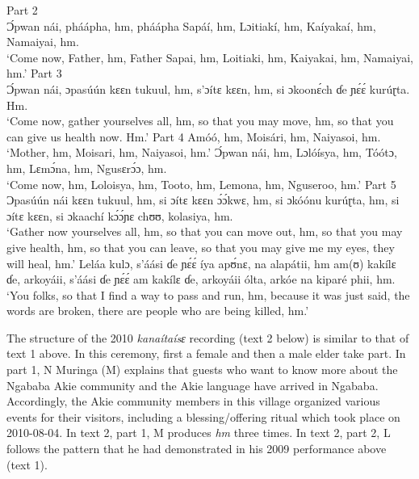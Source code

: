 \documentclass[output=paper,colorlinks,citecolor=brown]{langscibook}
\begin{document}

\ex   Part 2\\\largerpage[1]
      Ɔ́pwan nái, pháápha, hm, pháápha Sapáí, hm, Lɔitiakí, hm, Kaíyakaí, hm, Namaiyai, hm.\\
      `Come now, Father, hm, Father Sapai, hm, Loitiaki, hm, Kaiyakai, hm, Namaiyai, hm.'
\ex   Part 3\\
      Ɔ́pwan nái, ɔpasúún kɛɛn tukuul, hm, s’ɔítɛ kɛɛn, hm, si ɔkoonɛ́ch ɗe ɲɛ́ɛ́ kurúɽta. Hm.\\
      `Come now, gather yourselves all, hm, so that you may move, hm, so that you can  give us health now. Hm.'
\ex   Part 4
      \ea Amóó, hm, Moisári, hm, Naiyasoi, hm.\\
          `Mother, hm, Moisari, hm, Naiyasoi, hm.'
      \ex Ɔ́pwan nái, hm, Lɔlóísya, hm, Tóótɔ, hm, Lɛmɔ́na, hm, Ngusɛrɔ́ɔ, hm.\\
          `Come now, hm, Loloisya, hm, Tooto, hm, Lemona, hm, Nguseroo, hm.'
      \z
\ex   Part 5
    \ea Ɔpasúún nái kɛɛn tukuul, hm, si ɔítɛ kɛɛn ɔ́ɔ́kwɛ, hm, si ɔkóónu kurúɽta, hm, si ɔítɛ kɛɛn, si ɔkaachí kɔ́ɔ́ɲɛ chʊʊ, kolasiya, hm.\\
        `Gather now yourselves all, hm, so that you can move out, hm, so that you may give health, hm, so that you can leave, so that you may give me my eyes, they will heal, hm.'
    \ex Leláa kulɔ, s’áási ɗe ɲɛ́ɛ́ íya apʊ́nɛ, na alapátii, hm am(ʊ) kakílɛ ɗe, arkoyáii, s’áási ɗe ɲɛ́ɛ́ am kakílɛ ɗe, arkoyáii ólta, arkóe na kiparé phii, hm.\\
        `You folks, so that I find a way to pass and run, hm, because it was just said, the words are broken, there are people who are being killed, hm.'
    \z
\z

The structure of the 2010 \textit{kanaítaísɛ }recording (text 2 below) is similar to that of text 1 above. In this ceremony, first a female and then a male elder take part. In part 1, N Muringa (M) explains that guests who want to know more about the Ngababa Akie community and the Akie language have arrived in Ngababa. Accordingly, the Akie community members in this village organized various events for their visitors, including a blessing/offering ritual which took place on 2010-08-04. 
In text 2, part 1, M produces \textit{hm} three times. In text 2, part 2, L follows the pattern that he had demonstrated in his 2009 performance above (text 1).

\end{document}
